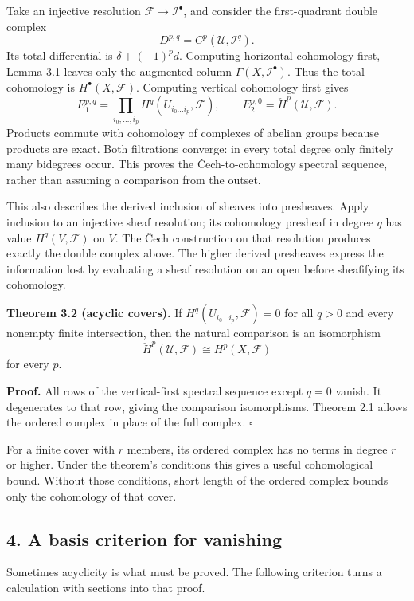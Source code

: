 \documentclass[11pt]{article}
\begin{document}
Take an injective resolution \(\mathcal F\to\mathcal I^\bullet\), and
consider the first-quadrant double complex \[
D^{p,q}=C^p(\mathcal U,\mathcal I^q).
\] Its total differential is \(\delta+(-1)^p d\). Computing horizontal
cohomology first, Lemma 3.1 leaves only the augmented column
\(\Gamma(X,\mathcal I^\bullet)\). Thus the total cohomology is
\(H^\bullet(X,\mathcal F)\). Computing vertical cohomology first gives
\[
E_1^{p,q}=\prod_{i_0,\ldots,i_p}
H^q(U_{i_0\ldots i_p},\mathcal F),
\qquad E_2^{p,0}=\check H^p(\mathcal U,\mathcal F).
\] Products commute with cohomology of complexes of abelian groups
because products are exact. Both filtrations converge: in every total
degree only finitely many bidegrees occur. This proves the
Čech-to-cohomology spectral sequence, rather than assuming a comparison
from the outset.

This also describes the derived inclusion of sheaves into presheaves.
Apply inclusion to an injective sheaf resolution; its cohomology
presheaf in degree \(q\) has value \(H^q(V,\mathcal F)\) on \(V\). The
Čech construction on that resolution produces exactly the double complex
above. The higher derived presheaves express the information lost by
evaluating a sheaf resolution on an open before sheafifying its
cohomology.

\textbf{Theorem 3.2 (acyclic covers).} If
\(H^q(U_{i_0\ldots i_p},\mathcal F)=0\) for all \(q>0\) and every
nonempty finite intersection, then the natural comparison is an
isomorphism \[
\check H^p(\mathcal U,\mathcal F)\cong H^p(X,\mathcal F)
\] for every \(p\).

\textbf{Proof.} All rows of the vertical-first spectral sequence except
\(q=0\) vanish. It degenerates to that row, giving the comparison
isomorphisms. Theorem 2.1 allows the ordered complex in place of the
full complex. \(\square\)

For a finite cover with \(r\) members, its ordered complex has no terms
in degree \(r\) or higher. Under the theorem's conditions this gives a
useful cohomological bound. Without those conditions, short length of
the ordered complex bounds only the cohomology of that cover.

\subsection{4. A basis criterion for
vanishing}\label{a-basis-criterion-for-vanishing}

Sometimes acyclicity is what must be proved. The following criterion
turns a calculation with sections into that proof.
\end{document}
